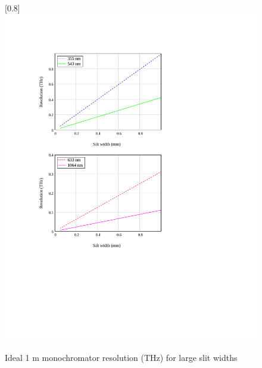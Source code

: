 \begin{figure}
\scalebox{0.8}[0.8]{
\includegraphics[bb=-30 230 489 700]
{far_THz/far_THz.pdf}
}
\caption{Ideal 1 m monochromator resolution (THz) for large slit widths}
\label{far_THz}
\end{figure}
